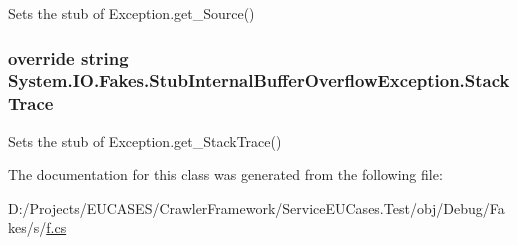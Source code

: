 Sets the stub of Exception.\-get\-\_\-\-Source()

\hypertarget{class_system_1_1_i_o_1_1_fakes_1_1_stub_internal_buffer_overflow_exception_a0a36bdaeed8c564059604ab213de55eb}{
\subsubsection[{Stack\-Trace}]{\setlength{\rightskip}{0pt plus 5cm}override string System.\-I\-O.\-Fakes.\-Stub\-Internal\-Buffer\-Overflow\-Exception.\-Stack\-Trace\hspace{0.3cm}{\ttfamily [get]}}}\label{class_system_1_1_i_o_1_1_fakes_1_1_stub_internal_buffer_overflow_exception_a0a36bdaeed8c564059604ab213de55eb}


Sets the stub of Exception.\-get\-\_\-\-Stack\-Trace()



The documentation for this class was generated from the following file\-:\begin{DoxyCompactItemize}
\item 
D\-:/\-Projects/\-E\-U\-C\-A\-S\-E\-S/\-Crawler\-Framework/\-Service\-E\-U\-Cases.\-Test/obj/\-Debug/\-Fakes/s/\hyperlink{s_2f_8cs}{f.\-cs}\end{DoxyCompactItemize}

